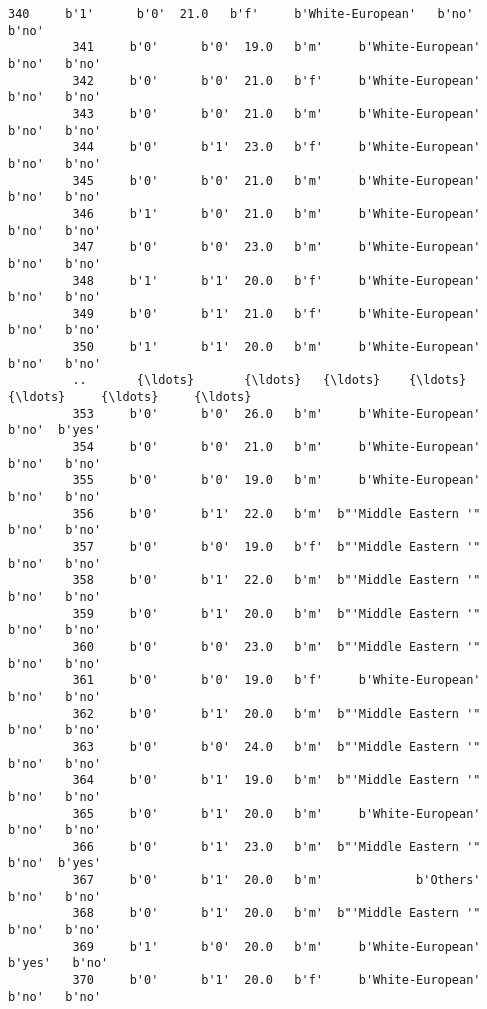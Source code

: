 \documentclass[11pt]{article}
\begin{document}
\begin{Verbatim}[commandchars=\\\{\}]
         340     b'1'      b'0'  21.0   b'f'     b'White-European'   b'no'   b'no'   
         341     b'0'      b'0'  19.0   b'm'     b'White-European'   b'no'   b'no'   
         342     b'0'      b'0'  21.0   b'f'     b'White-European'   b'no'   b'no'   
         343     b'0'      b'0'  21.0   b'm'     b'White-European'   b'no'   b'no'   
         344     b'0'      b'1'  23.0   b'f'     b'White-European'   b'no'   b'no'   
         345     b'0'      b'0'  21.0   b'm'     b'White-European'   b'no'   b'no'   
         346     b'1'      b'0'  21.0   b'm'     b'White-European'   b'no'   b'no'   
         347     b'0'      b'0'  23.0   b'm'     b'White-European'   b'no'   b'no'   
         348     b'1'      b'1'  20.0   b'f'     b'White-European'   b'no'   b'no'   
         349     b'0'      b'1'  21.0   b'f'     b'White-European'   b'no'   b'no'   
         350     b'1'      b'1'  20.0   b'm'     b'White-European'   b'no'   b'no'   
         ..       {\ldots}       {\ldots}   {\ldots}    {\ldots}                   {\ldots}     {\ldots}     {\ldots}   
         353     b'0'      b'0'  26.0   b'm'     b'White-European'   b'no'  b'yes'   
         354     b'0'      b'0'  21.0   b'm'     b'White-European'   b'no'   b'no'   
         355     b'0'      b'0'  19.0   b'm'     b'White-European'   b'no'   b'no'   
         356     b'0'      b'1'  22.0   b'm'  b"'Middle Eastern '"   b'no'   b'no'   
         357     b'0'      b'0'  19.0   b'f'  b"'Middle Eastern '"   b'no'   b'no'   
         358     b'0'      b'1'  22.0   b'm'  b"'Middle Eastern '"   b'no'   b'no'   
         359     b'0'      b'1'  20.0   b'm'  b"'Middle Eastern '"   b'no'   b'no'   
         360     b'0'      b'0'  23.0   b'm'  b"'Middle Eastern '"   b'no'   b'no'   
         361     b'0'      b'0'  19.0   b'f'     b'White-European'   b'no'   b'no'   
         362     b'0'      b'1'  20.0   b'm'  b"'Middle Eastern '"   b'no'   b'no'   
         363     b'0'      b'0'  24.0   b'm'  b"'Middle Eastern '"   b'no'   b'no'   
         364     b'0'      b'1'  19.0   b'm'  b"'Middle Eastern '"   b'no'   b'no'   
         365     b'0'      b'1'  20.0   b'm'     b'White-European'   b'no'   b'no'   
         366     b'0'      b'1'  23.0   b'm'  b"'Middle Eastern '"   b'no'  b'yes'   
         367     b'0'      b'1'  20.0   b'm'             b'Others'   b'no'   b'no'   
         368     b'0'      b'1'  20.0   b'm'  b"'Middle Eastern '"   b'no'   b'no'   
         369     b'1'      b'0'  20.0   b'm'     b'White-European'  b'yes'   b'no'   
         370     b'0'      b'1'  20.0   b'f'     b'White-European'   b'no'   b'no'   

\end{Verbatim}
\end{document}
